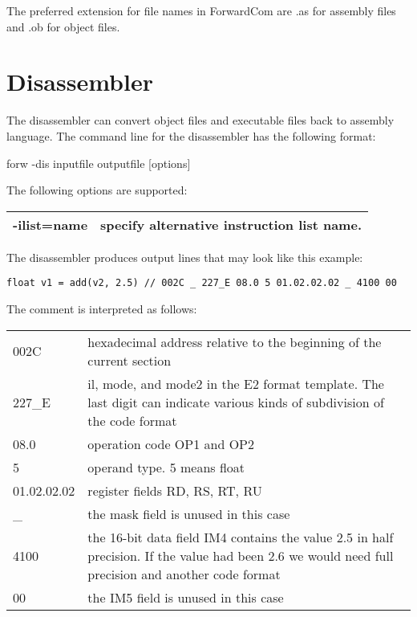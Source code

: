 \documentclass[forwardcom.tex]{subfiles}
\begin{document}
The preferred extension for file names in ForwardCom are .as for assembly files and .ob for object files.
\vv






\section{Disassembler} \label{disassembler}

The disassembler can convert object files and executable files back to assembly language.
The command line for the disassembler has the following format:

\vv
\hspace{5mm} {\ttfamily forw -dis inputfile outputfile [options]}

\vv
The following options are supported:\\
\begin{tabular}{|p{22mm}p{140mm}|}
\hline
-ilist=name & specify alternative instruction list name.\\
\hline
\end{tabular}
\vv

The disassembler produces output lines that may look like this example:

\begin{lstlisting}
float v1 = add(v2, 2.5) // 002C _ 227_E 08.0 5 01.02.02.02 _ 4100 00
\end{lstlisting}
\vv

The comment is interpreted as follows:\\
\vv

\begin{tabular}{|p{22mm}p{140mm}|}
\hline
002C & hexadecimal address relative to the beginning of the current section\\
227\_E  & il, mode, and mode2 in the E2 format template. The last digit can indicate various kinds of subdivision of the code format\\
08.0 & operation code OP1 and OP2\\
5    & operand type. 5 means float\\
01.02.02.02 & register fields RD, RS, RT, RU\\
\_   & the mask field is unused in this case\\
4100 & the 16-bit data field IM4 contains the value 2.5 in half precision. If the value had been 2.6 we would need full precision and another code format\\
00 & the IM5 field is unused in this case\\
\hline
\end{tabular}
\vspace{4mm}
\end{document}
